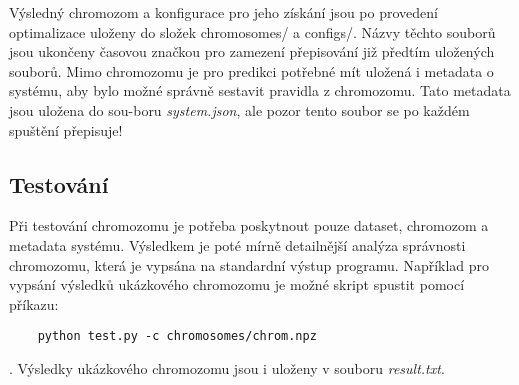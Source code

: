 \documentclass{article}
\begin{document}
Výsledný chromozom a konfigurace pro jeho získání jsou po provedení optimalizace uloženy do složek chromosomes/ a configs/. Názvy těchto souborů jsou ukončeny časovou značkou pro zamezení přepisování již předtím uložených souborů. Mimo chromozomu je pro predikci potřebné mít uložená i metadata o systému, aby bylo možné správně sestavit pravidla z chromozomu. Tato metadata jsou uložena do sou-boru \emph{system.json}, ale pozor tento soubor se po každém spuštění přepisuje!

\subsection{Testování}

Při testování chromozomu je potřeba poskytnout pouze dataset, chromozom a metadata systému. Výsledkem je poté mírně detailnější analýza správnosti chromozomu, která je vypsána na standardní výstup programu. Například pro vypsání výsledků ukázkového chromozomu je možné skript spustit pomocí příkazu:

\begin{verbatim}
    python test.py -c chromosomes/chrom.npz
\end{verbatim}
. Výsledky ukázkového chromozomu jsou i uloženy v souboru \emph{result.txt}.
\end{document}
